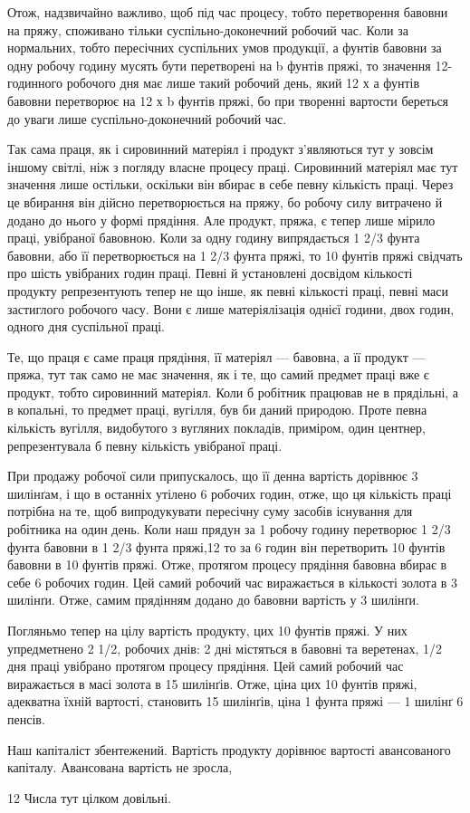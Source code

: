 Отож, надзвичайно важливо, щоб під час процесу, тобто перетворення
бавовни на пряжу, споживано тільки суспільно-доконечний
робочий час. Коли за нормальних, тобто пересічних
суспільних умов продукції, а фунтів бавовни за одну робочу
годину мусять бути перетворені на b фунтів пряжі, то значення
12-годинного робочого дня має лише такий робочий день, який
12 х а фунтів бавовни перетворює на 12 х b фунтів пряжі, бо
при творенні вартости береться до уваги лише суспільно-доконечний
робочий час.

Так сама праця, як і сировинний матеріял і продукт з’являються
тут у зовсім іншому світлі, ніж з погляду власне процесу
праці. Сировинний матеріял має тут значення лише остільки,
оскільки він вбирає в себе певну кількість праці. Через це вбирання
він дійсно перетворюється на пряжу, бо робочу силу витрачено
й додано до нього у формі прядіння. Але продукт, пряжа,
є тепер лише мірило праці, увібраної бавовною. Коли за одну
годину випрядається 1 2/3 фунта бавовни, або її перетворюється на
1 2/3 фунта пряжі, то 10 фунтів пряжі свідчать про шість увібраних
годин праці. Певні й установлені досвідом кількості продукту
репрезентують тепер не що інше, як певні кількості праці, певні
маси застиглого робочого часу. Вони є лише матеріялізація однієї
години, двох годин, одного дня суспільної праці.

Те, що праця є саме праця прядіння, її матеріял — бавовна,
а її продукт — пряжа, тут так само не має значення, як і те, що
самий предмет праці вже є продукт, тобто сировинний матеріял.
Коли б робітник працював не в прядільні, а в копальні, то предмет
праці, вугілля, був би даний природою. Проте певна кількість
вугілля, видобутого з вугляних покладів, приміром, один
центнер, репрезентувала б певну кількість увібраної праці.

При продажу робочої сили припускалось, що її денна вартість
дорівнює 3 шилінґам, і що в останніх утілено 6 робочих годин,
отже, що ця кількість праці потрібна на те, щоб випродукувати
пересічну суму засобів існування для робітника на один день.
Коли наш прядун за 1 робочу годину перетворює 1 2/3 фунта
бавовни в 1 2/3 фунта пряжі,12 то за 6 годин він перетворить
10 фунтів бавовни в 10 фунтів пряжі. Отже, протягом процесу
прядіння бавовна вбирає в себе 6 робочих годин. Цей самий робочий
час виражається в кількості золота в 3 шилінґи. Отже, самим
прядінням додано до бавовни вартість у 3 шилінґи.

Погляньмо тепер на цілу вартість продукту, цих 10 фунтів
пряжі. У них упредметнено 2 1/2, робочих днів: 2 дні містяться в
бавовні та веретенах, 1/2 дня праці увібрано протягом процесу прядіння.
Цей самий робочий час виражається в масі золота в 15 шилінґів.
Отже, ціна цих 10 фунтів пряжі, адекватна їхній вартості,
становить 15 шилінґів, ціна 1 фунта пряжі — 1 шилінґ 6 пенсів.

Наш капіталіст збентежений. Вартість продукту дорівнює
вартості авансованого капіталу. Авансована вартість не зросла,

12 Числа тут цілком довільні.
